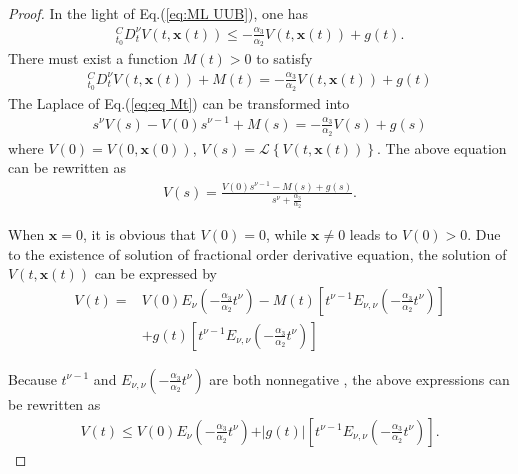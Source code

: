 \documentclass[ShortAfour]{sage}
\theoremstyle{plain}
\theoremstyle{remark}
\begin{document}
\begin{proof}
In the light of Eq.(\ref{eq:ML UUB}), one has
\begin{align}
  ^C_{t_0} D^\nu_t V(t,\bm x(t))\le -\frac{\alpha_3}{\alpha_2}V(t,\bm x(t))+g(t).
\end{align}
There must exist a function $M(t)>0$ to satisfy
\begin{align}\label{eq:eq Mt}
  ^C_{t_0} D^\nu_t V(t,\bm x(t)) + M(t)= -\frac{\alpha_3}{\alpha_2}V(t,\bm x(t))+g(t)
\end{align}
The Laplace of Eq.(\ref{eq:eq Mt}) can be transformed into
\begin{align}
  s^\nu V(s)-V(0)s^{\nu-1}+M(s)=-\frac{\alpha_3}{\alpha_2}V(s)+g(s)
\end{align}
where $V(0)=V(0,\bm x(0))$, $V(s)=\mathcal L\left\{V(t,\bm x(t))\right\}$. The above equation can be rewritten as
\begin{align}
  V(s)=\frac{V(0)s^{\nu-1}-M(s)+g(s)}{s^{\nu}+\frac{\alpha_3}{\alpha_2}}.
\end{align}

When $\bm x=0$, it is obvious that $V(0)=0$, while $\bm x\neq 0$ leads to $V(0)>0$. Due to the existence of solution of fractional order derivative equation\cite{Podlubny1999}, the solution of $V(t,\bm x(t))$ can be expressed by
\begin{align*}
  V(t)=&V(0)E_\nu\left(-\frac{\alpha_3}{\alpha_2}t^\nu\right)-M(t)\left[t^{\nu-1}E_{\nu,\nu}\left(-\frac{\alpha_3}{\alpha_2}t^\nu\right)\right]\\
  &+g(t)\left[t^{\nu-1}E_{\nu,\nu}\left(-\frac{\alpha_3}{\alpha_2}t^\nu\right)\right]
\end{align*}

Because $t^{\nu-1}$ and $E_{\nu,\nu}\left(-\frac{\alpha_3}{\alpha_2}t^\nu\right)$ are both nonnegative \cite{Miller2001Completely}, the above expressions can be rewritten as
\begin{align}\label{eq:solution fo UUB}
  V(t)\le V(0)E_\nu\left(-\frac{\alpha_3}{\alpha_2}t^\nu\right)+\vert g(t)\vert\left[t^{\nu-1}E_{\nu,\nu}\left(-\frac{\alpha_3}{\alpha_2}t^\nu\right)\right].
\end{align}




\end{proof}
\end{document}
